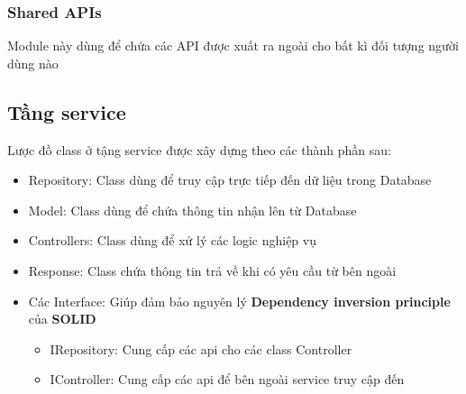 \subsubsection{Shared APIs}
Module này dùng để chứa các API được xuất ra ngoài cho bất kì đối tượng người dùng nào




\subsection{Tầng service}

Lược đồ class ở tậng service được xây dựng theo các thành phần sau:
\begin{itemize}
	\item Repository: Class dùng để truy cập trực tiếp đến dữ liệu trong Database
	\item Model: Class dùng để chứa thông tin nhận lên từ Database
	\item Controllers: Class dùng để xử lý các logic nghiệp vụ
	\item Response: Class chứa thông tin trả về khi có yêu cầu từ bên ngoài
	\item Các Interface: Giúp đảm bảo nguyên lý \textbf{Dependency inversion principle} của \textbf{SOLID}
	      \begin {itemize}
	\item IRepository: Cung cấp các api cho các class Controller
	\item IController: Cung cấp các api để bên ngoài service truy cập đến
\end{itemize}
\end{itemize}



